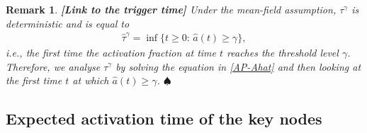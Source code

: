 \documentclass[11pt]{article}
\newtheorem{Remark}[Theorem]{Remark}
\numberwithin{equation}{section}
\begin{document}
\begin{Remark}{\bf [Link to the trigger time]}
\label{taualpha}
\rm{Under the mean-field assumption, $\tau^\gamma$ is deterministic and is equal to
\begin{align*}
\hat{\tau}^\gamma = \inf\big\{t\geq 0\colon\, \hat{a}(t)\geq \gamma\big\},
\end{align*}
i.e., the first time the activation fraction at time $t$ reaches the threshold level $\gamma$. Therefore, we analyse $\tau^\gamma$ by solving the equation in \eqref{AP-Ahat} and then looking at the first time $t$ at which $\hat{a}(t)\geq \gamma$. 
\hfill$\spadesuit$}
\end{Remark}


\subsection{Expected activation time of the key nodes}
\label{ss.expact}
\end{document}
